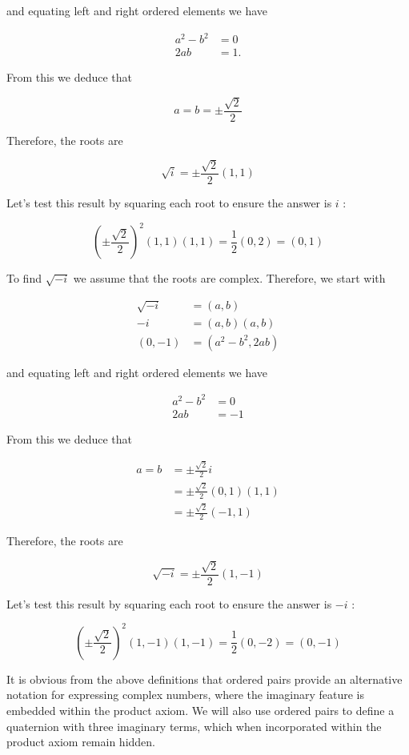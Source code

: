 and equating left and right ordered elements we have

$$
\begin{aligned}
a^{2}-b^{2} & =0 \\
2 a b & =1 .
\end{aligned}
$$

From this we deduce that

$$
a=b= \pm \frac{\sqrt{2}}{2}
$$

Therefore, the roots are

$$
\sqrt{i}= \pm \frac{\sqrt{2}}{2}(1,1)
$$

Let's test this result by squaring each root to ensure the answer is $i$ :

$$
\left( \pm \frac{\sqrt{2}}{2}\right)^{2}(1,1)(1,1)=\frac{1}{2}(0,2)=(0,1)
$$

To find $\sqrt{-i}$ we assume that the roots are complex. Therefore, we start with

$$
\begin{aligned}
\sqrt{-i} & =(a, b) \\
-i & =(a, b)(a, b) \\
(0,-1) & =\left(a^{2}-b^{2}, 2 a b\right)
\end{aligned}
$$

and equating left and right ordered elements we have

$$
\begin{aligned}
a^{2}-b^{2} & =0 \\
2 a b & =-1
\end{aligned}
$$

From this we deduce that

$$
\begin{aligned}
a=b & = \pm \frac{\sqrt{2}}{2} i \\
& = \pm \frac{\sqrt{2}}{2}(0,1)(1,1) \\
& = \pm \frac{\sqrt{2}}{2}(-1,1)
\end{aligned}
$$

Therefore, the roots are

$$
\sqrt{-i}= \pm \frac{\sqrt{2}}{2}(1,-1)
$$

Let's test this result by squaring each root to ensure the answer is $-i$ :

$$
\left( \pm \frac{\sqrt{2}}{2}\right)^{2}(1,-1)(1,-1)=\frac{1}{2}(0,-2)=(0,-1)
$$

It is obvious from the above definitions that ordered pairs provide an alternative notation for expressing complex numbers, where the imaginary feature is embedded within the product axiom. We will also use ordered pairs to define a quaternion with three imaginary terms, which when incorporated within the product axiom remain hidden.

